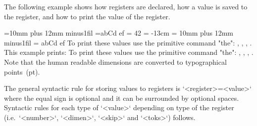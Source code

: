 {The following example shows how registers are declared, how a value is
saved to the register, and how to print the value of the register. 

 \tmpdim=-13cm =10mm plus 12mm minus1fil ={abCd ef}
\begtt
\newcount  \mynumber
\newdimen  \mydimen
\newskip   \myskip
\newtoks   \mytoks
\mynumber = 42
\mydimen = -13cm
\myskip = 10mm plus 12mm minus1fil
\mytoks = {abCd ef}
To print these values use the primitive command "the":
\the\mynumber, \the\mydimen, \the\myskip, \the\mytoks.
\bye
\endtt
%
This example prints: To print these values use the primitive command "the":
\the\tmpnum, \the\tmpdim, \the{}, \the{}. Note that the human
readable dimensions are converted to typographical points~(pt).

The general syntactic rule for storing values to registers is 
`<register>=<value>` where the equal sign is optional and it can be surrounded by
optional spaces. Syntactic rules for each type of `<value>` depending on
type of the register (i.e.\ `<number>`, `<dimen>`, `<skip>` and `<toks>`) follows.

}
